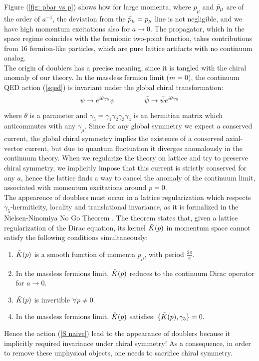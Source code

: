 Figure (\ref{fig: pbar vs p}) shows how for large momenta, where $p_\mu$ and $\Bar{p}_\mu$ are of the order of $a^{-1}$, the deviation from the $\Bar{p}_\mu = p_\mu$ line is not negligible, and we have high momentum excitations also for $a \to 0$.
The propagator, which in the space regime coincides with the fermionic two-point function, takes contributions from 16 fermion-like particles, which are pure lattice artifacts with no continuum analog.
\\ The origin of doublers has a precise meaning, since it is tangled with the chiral anomaly of our theory.
In the massless fermion limit ($m = 0$), the continuum QED action (\ref{sqed}) is invariant under the global chiral transformation:
\begin{equation}
    \psi \to e^{i\theta \gamma_5} \psi \hspace{15mm} \Bar{\psi} \to \Bar{\psi} e^{i\theta \gamma_5}
\end{equation}
where $\theta$ is a parameter and $\gamma_5 = \gamma_1 \gamma_2 \gamma_3 \gamma_4$ is an hermitian matrix which anticommutes with any $\gamma_\mu$. Since for any global symmetry we expect a conserved current, the global chiral symmetry implies the existence of a conserved axial-vector current, but due to quantum fluctuation it diverges anomalously in the continuum theory. When we regularize the theory on lattice and try to preserve chiral symmetry, we implicitly impose that this current is strictly conserved for any $a$, hence the lattice finds a way to cancel the anomaly of the continuum limit, associated with momentum excitations around $p = 0.$
\\ The appearence of doublers must occur in a lattice regularization which respects $\gamma_5$-hermiticity, locality and translational invariance, as it is formalized in the Nielsen-Ninomiya No Go Theorem \cite{NIELSEN198120}. The theorem states that, given a lattice regularization of the Dirac equation, its kernel $\Tilde{K}(p)$ in momentum space cannot satisfy the following conditions simultaneously:
\begin{enumerate}
    \item $\Tilde{K}(p)$ is a smooth function of momenta $p_\mu$, with period $\frac{2\pi}{a}$.
    \item In the massless fermions limit, $\Tilde{K}(p)$ reduces to the continuum Dirac operator for $a \to 0$.
    \item $\Tilde{K}(p)$ is invertible $\forall p \neq 0.$
    \item In the massless fermions limit, $\Tilde{K}(p)$ satisfies: $\{\Tilde{K}(p), \gamma_5 \} = 0.$
\end{enumerate}
Hence the action (\ref{S naive}) lead to the appearance of doublers because it implicitly required invariance under chiral symmetry! As a consequence, in order to remove these unphysical objects, one needs to sacrifice chiral symmetry. 

